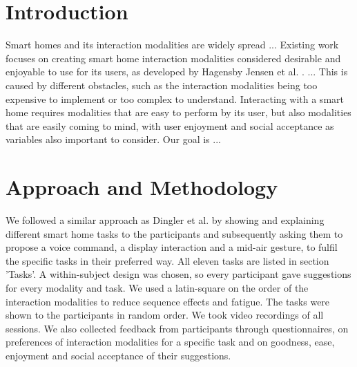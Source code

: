 \documentclass[sigchi]{acmart}
\begin{document}
	
	
	
	
	\maketitle
	
	\section{Introduction}
	Smart homes and its interaction modalities are widely spread ...  Existing work focuses on creating smart home interaction modalities considered desirable and enjoyable to use for its users, as developed by Hagensby Jensen et al. \cite{Jensen.2018}. ... This is caused by different obstacles, such as the interaction modalities being too expensive to implement or too complex to understand. Interacting with a smart home requires modalities that are easy to perform by its user, but also modalities that are easily coming to mind, with user enjoyment and social acceptance as variables also important to consider. Our goal is ... 
	
	\section{Approach and Methodology}
	We followed a similar approach as Dingler et al. \cite{Dingler.2018} by showing and explaining different smart home tasks to the participants and subsequently asking them to propose a voice command, a display interaction and a mid-air gesture, to fulfil the specific tasks in their preferred way. All eleven tasks are listed in section 'Tasks'. A within-subject design was chosen, so every participant gave suggestions for every modality and task. We used a latin-square on the order of the interaction modalities to reduce sequence effects \cite{.2017} and fatigue. The tasks were shown to the participants in  random order. We took video recordings of all sessions. We also collected feedback from participants through questionnaires, on preferences of interaction modalities for a specific task and on goodness, ease, enjoyment and social acceptance of their suggestions.
	
\end{document}
